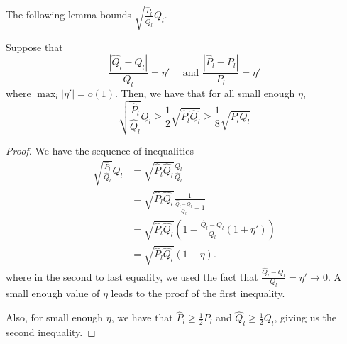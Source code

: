 \documentclass{article}
\begin{document}
The following lemma bounds $\sqrt{ \frac{\hat{P}_l}{\hat{Q}_l} } Q_l$. 
\begin{lemma}
\label{lem:sqrt_ratio_times_ql}
Suppose that
\[
\frac{|\hat{Q}_l - Q_l|}{Q_l} = \eta' \quad \text{ and }
\frac{|\hat{P}_l - P_l|}{P_l} = \eta'
\]
where $\max_l |\eta'| = o(1)$. Then, we have that for all small enough $\eta$, 
\[
\sqrt{ \frac{\hat{P}_l}{\hat{Q}_l} } Q_l \geq \frac{1}{2} \sqrt{\hat{P}_l \hat{Q}_l} \geq
  \frac{1}{8} \sqrt{P_l Q_l}
\]
\end{lemma}


\begin{proof}
We have the sequence of inequalities
\begin{align*}
\sqrt{\frac{\hat{P}_l}{\hat{Q}_l} } Q_l  &= \sqrt{ \hat{P}_l \hat{Q}_l} \frac{Q_l}{\hat{Q}_l} \\
&= \sqrt{\hat{P}_l \hat{Q}_l} \frac{1}{ \frac{\hat Q_l - {Q}_l}{Q_l} + 1 } \\
&= \sqrt{\hat{P}_l \hat{Q}_l} 
  \left( 1 - \frac{\hat{Q}_l - Q_l}{Q_l} (1 + \eta') \right)  \\
&= \sqrt{\hat{P}_l \hat{Q}_l} (1 - \eta).
\end{align*}
where in the second to last equality, we used the fact that $\frac{\hat{Q}_l - Q_l}{Q_l} = \eta' \rightarrow 0$. A small enough value of $\eta$ leads to the proof of the first inequality.

Also, for small enough $\eta$, we have that $\hat{P}_l \geq \frac{1}{2} P_l$ and $\hat{Q}_l \geq \frac{1}{2} Q_l$, giving us the second inequality.
\end{proof}
\end{document}
